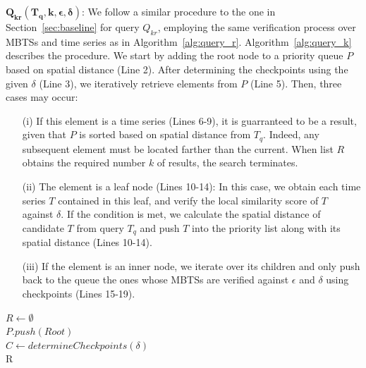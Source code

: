 \vspace{2mm}

\noindent $\mathbold{Q_{kr}(T_q, k, \epsilon, \delta)}$: We follow a similar procedure to the one in Section~\ref{sec:baseline} for query $Q_{kr}$, employing the same verification process over MBTSs and time series as in Algorithm~\ref{alg:query_r}. Algorithm~\ref{alg:query_k} describes the procedure. We start by adding the root node to a priority queue $P$ based on spatial distance (Line 2). After determining the checkpoints using the given $\delta$ (Line 3), we iteratively retrieve elements from $P$ (Line 5). Then, three cases may occur: 
\begin{enumerate}
\item[(i)] If this element is a time series (Lines 6-9), it is guarranteed to be a result, given that $P$ is sorted based on spatial distance from $T_q$. Indeed, any subsequent element must be located farther than the current. When list $R$ obtains the required number $k$ of results, the search terminates. 
\item[(ii)] The element is a leaf node (Lines 10-14): In this case, we obtain each time series $T$ contained in this leaf, and verify the local similarity score of $T$ against $\delta$. If the condition is met, we calculate the spatial distance of candidate $T$ from query $T_q$ and push $T$ into the priority list along with its spatial distance (Lines 10-14). 
\item[(iii)] If the element is an inner node, we iterate over its children and only push back to the queue the ones whose MBTSs are verified against $\epsilon$ and $\delta$ using checkpoints (Lines 15-19).
\end{enumerate}

\SetAlFnt{\small}
\begin{algorithm}[!t]
	\DontPrintSemicolon
	$R \leftarrow \emptyset$ \\
	$P.push(Root)$ \\
	$C \leftarrow determineCheckpoints(\delta)$ \\
	\KwRet R
	\caption{$Q_{kr}(T_q, k, \epsilon, \delta)$}
	\label{alg:query_k}	
\end{algorithm}

